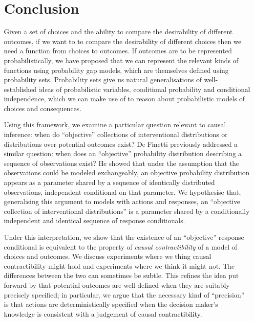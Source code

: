 
\section{Conclusion}

Given a set of choices and the ability to compare the desirability of different outcomes, if we want to to compare the desirability of different choices then we need a function from choices to outcomes. If outcomes are to be represented probabilistically, we have proposed that we can represent the relevant kinds of functions using probability gap models, which are themselves defined using probability sets. Probability sets give us natural generalisations of well-established ideas of probabilistic variables, conditional probability and conditional independence, which we can make use of to reason about probabilistic models of choices and consequences.

Using this framework, we examine a particular question relevant to causal inference: when do ``objective'' collections of interventional distributions or distributions over potential outcomes exist? De Finetti previously addressed a similar question: when does an ``objective'' probability distribution describing a sequence of observations exist? He showed that under the assumption that the observations could be modeled exchangeably, an objective probability distribution appears as a parameter shared by a sequence of identically distributed observations, independent conditional on that parameter. We hypothesise that, generalising this argument to models with actions and responses, an ``objective collection of interventional distributions'' is a parameter shared by a conditionally independent and identical sequence of response conditionals.

Under this interpretation, we show that the existence of an ``objective'' response conditional is equivalent to the property of \emph{causal contractibility} of a model of choices and outcomes. We discuss experiments where we thing causal contractibility might hold and experiments where we think it might not. The differences between the two can sometimes be subtle. This refines the idea put forward by \citet{noauthor_does_2016} that potential outcomes are well-defined when they are suitably precisely specified; in particular, we argue that the necessary kind of ``precision'' is that actions are deterministically specified when the decision maker's knowledge is consistent with a judgement of causal contractibility.

